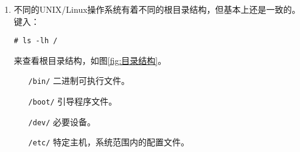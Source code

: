 \documentclass[cs4size,a4paper,nofonts]{ctexart}
\begin{document}
\begin{enumerate}

\item 不同的UNIX/Linux操作系统有着不同的根目录结构，但基本上还是一致的。键入：
\begin{Verbatim}
# ls -lh /
\end{Verbatim}
来查看根目录结构，如图\ref{fig:目录结构}。

\begin{figure}[htp]
\end{figure}

\begin{itemize}

\item[\tt /bin/]   二进制可执行文件。
\item[\tt /boot/]  引导程序文件。
\item[\tt /dev/]   必要设备。
\item[\tt /etc/]   特定主机，系统范围内的配置文件。


\end{itemize}
\end{enumerate}
\end{document}
